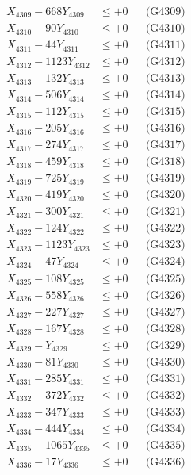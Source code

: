 \documentclass[a4paper,10pt]{article}
\begin{document}
{\begin{align}
X_{4309} - 668Y_{4309} &\leq +0 && \text{(G4309)} \\
X_{4310} - 90Y_{4310} &\leq +0 && \text{(G4310)} \\
\allowbreak
X_{4311} - 44Y_{4311} &\leq +0 && \text{(G4311)} \\
X_{4312} - 1123Y_{4312} &\leq +0 && \text{(G4312)} \\
X_{4313} - 132Y_{4313} &\leq +0 && \text{(G4313)} \\
X_{4314} - 506Y_{4314} &\leq +0 && \text{(G4314)} \\
X_{4315} - 112Y_{4315} &\leq +0 && \text{(G4315)} \\
X_{4316} - 205Y_{4316} &\leq +0 && \text{(G4316)} \\
X_{4317} - 274Y_{4317} &\leq +0 && \text{(G4317)} \\
X_{4318} - 459Y_{4318} &\leq +0 && \text{(G4318)} \\
X_{4319} - 725Y_{4319} &\leq +0 && \text{(G4319)} \\
X_{4320} - 419Y_{4320} &\leq +0 && \text{(G4320)} \\
\allowbreak
X_{4321} - 300Y_{4321} &\leq +0 && \text{(G4321)} \\
X_{4322} - 124Y_{4322} &\leq +0 && \text{(G4322)} \\
X_{4323} - 1123Y_{4323} &\leq +0 && \text{(G4323)} \\
X_{4324} - 47Y_{4324} &\leq +0 && \text{(G4324)} \\
X_{4325} - 108Y_{4325} &\leq +0 && \text{(G4325)} \\
X_{4326} - 558Y_{4326} &\leq +0 && \text{(G4326)} \\
X_{4327} - 227Y_{4327} &\leq +0 && \text{(G4327)} \\
X_{4328} - 167Y_{4328} &\leq +0 && \text{(G4328)} \\
X_{4329} - Y_{4329} &\leq +0 && \text{(G4329)} \\
X_{4330} - 81Y_{4330} &\leq +0 && \text{(G4330)} \\
\allowbreak
X_{4331} - 285Y_{4331} &\leq +0 && \text{(G4331)} \\
X_{4332} - 372Y_{4332} &\leq +0 && \text{(G4332)} \\
X_{4333} - 347Y_{4333} &\leq +0 && \text{(G4333)} \\
X_{4334} - 444Y_{4334} &\leq +0 && \text{(G4334)} \\
X_{4335} - 1065Y_{4335} &\leq +0 && \text{(G4335)} \\
X_{4336} - 17Y_{4336} &\leq +0 && \text{(G4336)} \\

\end{align}}
\end{document}
